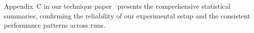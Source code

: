  Appendix~C in our technique paper~\cite{Xu2026MRImaginTime} presents the comprehensive statistical summaries, confirming the reliability of our experimental setup and the consistent performance patterns across runs.


